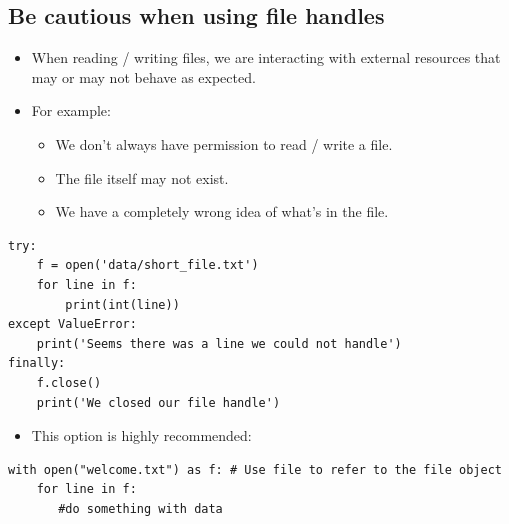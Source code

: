 \documentclass[aspectratio=1610,slidestop]{beamer}
\begin{document}
\subsection{Be cautious when using file handles}
\begin{pframe}
 \begin{itemize}
  \item When reading / writing files, we are interacting with external resources
  that may or may not behave as expected.
  \item For example:
  \begin{itemize}
   \item We don't always have permission to read / write a file.
   \item The file itself may not exist.
   \item We have a completely wrong idea of what's in the file.
  \end{itemize}
 \end{itemize}
 \vspace{-0.3cm}
 \begin{pythoncode}
  \begin{verbatim}
try:
    f = open('data/short_file.txt')
    for line in f:
        print(int(line))
except ValueError:
    print('Seems there was a line we could not handle')
finally:
    f.close()
    print('We closed our file handle')
  \end{verbatim}
 \end{pythoncode}
\end{pframe}

\begin{pframe}
 \begin{itemize}
  \item This option is highly recommended:
 \end{itemize}
 \begin{pythoncode}
  \begin{verbatim}
with open("welcome.txt") as f: # Use file to refer to the file object
    for line in f:
       #do something with data
  \end{verbatim}
 \end{pythoncode}

\end{pframe}
\end{document}
